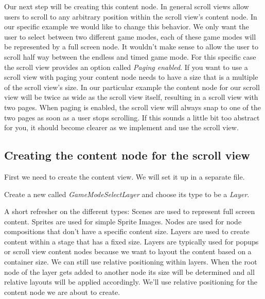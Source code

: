 Our next step will be creating this content node. In general scroll views allow
users to scroll to any arbitrary position within the scroll view's content node.
In our specific example we would like to change this behavior. We only
want the user to select between two different game modes, each of these game modes will be
represented by a full screen node. It wouldn't make sense to allow the user to
scroll half way between the endless and timed game mode. For this specific case
the scroll view provides an option called \textit{Paging enabled}. If you want
to use a scroll view with paging your content node needs to have a size that is
a multiple of the scroll view's size. In our particular example the content node
for our scroll view will be twice as wide as the scroll view itself, resulting
in a scroll view with two pages. When paging is enabled, the scroll view will
always snap to one of the two pages as soon as a user stops scrolling. If this
sounds a little bit too abstract for you, it should become clearer as we implement and use the scroll view.

\subsection{Creating the content node for the scroll view}

First we need to create the content view. We will set it up in a separate
\ccbfile{} file. 
\begin{leftbar}
Create a new \ccbfile{} called \textit{GameModeSelectLayer} and choose its type
to be a \textit{Layer}.
\end{leftbar}

\begin{details}[frametitle={Why are we using a Layer to create the scroll view
content?}]
A short refresher on the different \ccbfile{} types: Scenes are used to
represent full screen content. Sprites are used for simple Sprite Images. Nodes
are used for node compositions that don't have a specific content size. Layers
are used to create content within a stage that has a fixed size.
Layers are typically used for popups or scroll view content nodes because we
want to layout the content based on a container size. We can still use relative
positioning within layers. When the root node of the layer \ccbfile{} gets added
to another node its size will be determined and all relative layouts will be
applied accordingly. We'll use relative positioning for the content node we are
about to create.
\end{details}

